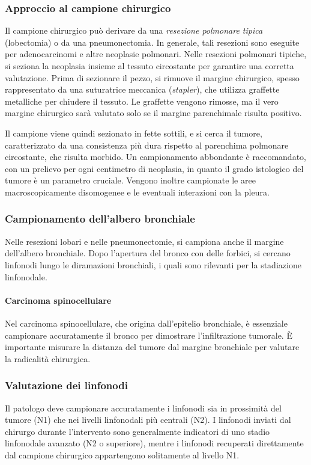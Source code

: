 \subsubsection{Approccio al campione chirurgico}
Il campione chirurgico può derivare da una \textit{resezione polmonare tipica} (lobectomia) o da una pneumonectomia. In generale, tali resezioni sono eseguite per adenocarcinomi e altre neoplasie polmonari. Nelle resezioni polmonari tipiche, si seziona la neoplasia insieme al tessuto circostante per garantire una corretta valutazione. Prima di sezionare il pezzo, si rimuove il margine chirurgico, spesso rappresentato da una suturatrice meccanica (\textit{stapler}), che utilizza graffette metalliche per chiudere il tessuto. Le graffette vengono rimosse, ma il vero margine chirurgico sarà valutato solo se il margine parenchimale risulta positivo. 

Il campione viene quindi sezionato in fette sottili, e si cerca il tumore, caratterizzato da una consistenza più dura rispetto al parenchima polmonare circostante, che risulta morbido. Un campionamento abbondante è raccomandato, con un prelievo per ogni centimetro di neoplasia, in quanto il grado istologico del tumore è un parametro cruciale. Vengono inoltre campionate le aree macroscopicamente disomogenee e le eventuali interazioni con la pleura.

\subsubsection{Campionamento dell’albero bronchiale}
Nelle resezioni lobari e nelle pneumonectomie, si campiona anche il margine dell'albero bronchiale. Dopo l’apertura del bronco con delle forbici, si cercano linfonodi lungo le diramazioni bronchiali, i quali sono rilevanti per la stadiazione linfonodale.

\paragraph{Carcinoma spinocellulare}
Nel carcinoma spinocellulare, che origina dall'epitelio bronchiale, è essenziale campionare accuratamente il bronco per dimostrare l'infiltrazione tumorale. È importante misurare la distanza del tumore dal margine bronchiale per valutare la radicalità chirurgica.

\subsubsection{Valutazione dei linfonodi}
Il patologo deve campionare accuratamente i linfonodi sia in prossimità del tumore (N1) che nei livelli linfonodali più centrali (N2). I linfonodi inviati dal chirurgo durante l'intervento sono generalmente indicatori di uno stadio linfonodale avanzato (N2 o superiore), mentre i linfonodi recuperati direttamente dal campione chirurgico appartengono solitamente al livello N1.

